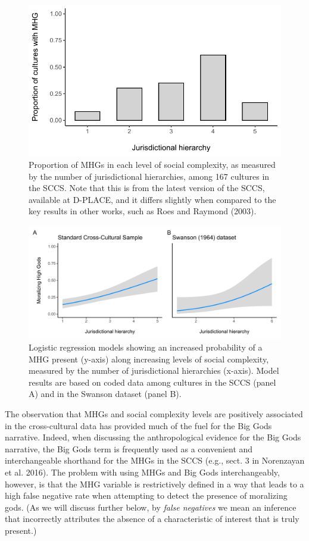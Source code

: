 \documentclass[
]{article}
\begin{document}
\begin{figure}
\centering
\includegraphics{mhg-writeup_files/figure-latex/standardSCCS-1.pdf}
\caption{\label{fig:standardSCCS}Proportion of MHGs in each level of social complexity, as measured by the number of jurisdictional hierarchies, among 167 cultures in the SCCS. Note that this is from the latest version of the SCCS, available at D-PLACE, and it differs slightly when compared to the key results in other works, such as Roes and Raymond (2003).}
\end{figure}

\begin{figure}
\centering
\includegraphics{mhg-writeup_files/figure-latex/mhgPlot-1.pdf}
\caption{\label{fig:mhgPlot}Logistic regression models showing an increased probability of a MHG present (y-axis) along increasing levels of social complexity, measured by the number of jurisdictional hierarchies (x-axis). Model results are based on coded data among cultures in the SCCS (panel A) and in the Swanson dataset (panel B).}
\end{figure}

The observation that MHGs and social complexity levels are positively associated in the cross-cultural data has provided much of the fuel for the Big Gods narrative. Indeed, when discussing the anthropological evidence for the Big Gods narrative, the Big Gods term is frequently used as a convenient and interchangeable shorthand for the MHGs in the SCCS (e.g., sect. 3 in Norenzayan et al. 2016). The problem with using MHGs and Big Gods interchangeably, however, is that the MHG variable is restrictively defined in a way that leads to a high false negative rate when attempting to detect the presence of moralizing gods. (As we will discuss further below, by \emph{false negatives} we mean an inference that incorrectly attributes the absence of a characteristic of interest that is truly present.)
\end{document}
